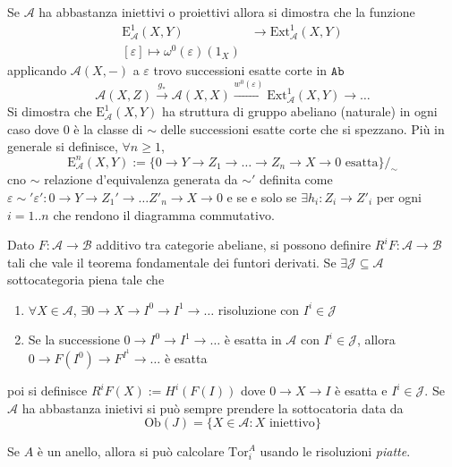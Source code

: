 Se \(\mathcal{A}\) ha abbastanza iniettivi o proiettivi allora si dimostra che
la funzione
\begin{align*}
    \mathrm{E}_\mathcal{A}^{1}{(X, Y)} &\to \mathrm{Ext}_\mathcal{A}^{1}{(X, Y)}
    \\
    [\varepsilon] \longmapsto \omega^{0}{(\varepsilon)}{(1_X)}
\end{align*}
applicando \(\mathcal{A}{(X, -)}\) a \(\varepsilon\) trovo successioni esatte
corte in \(\mathtt{Ab}\) 
\[
  \mathcal{A}{(X, Z)} \overset{g_*}{\to} \mathcal{A}{(X, X)}
  \overset{w^{0}{(\varepsilon)}}{\to} \mathrm{Ext}^{1}_\mathcal{A}{(X, Y)} \to
  \dots
\]
Si dimostra che \(\mathrm{E}^{1}_\mathcal{A}{(X, Y)}\) ha struttura di gruppo
abeliano (naturale) in ogni caso dove 0 è la classe di \(\sim \) delle successioni esatte
corte che si spezzano.
Più in generale si definisce, \(\forall n \ge  1\),
\[
  \mathrm{E}_\mathcal{A}^{n}{(X, Y)} := \{0 \to Y \to Z_{1} \to \dots \to Z_n
  \to X \to 0 \text{ esatta}\}/_\sim 
\]
cno \(\sim \) relazione d'equivalenza generata da \(\sim'\) definita come
\(\varepsilon \sim' \varepsilon' : 0 \to Y \to Z_{1}' \to \dots Z'_n \to X \to
0\) e se e solo se \(\exists h_i : Z_{i} \to Z'_i\) per ogni \(i = 1..n\)  che
rendono il diagramma commutativo.


    Dato \(F : \mathcal{A} \to \mathcal{B}\) additivo tra categorie abeliane, si
    possono definire \(R^{i}F : \mathcal{A} \to \mathcal{B}\) tali che vale il 
    teorema fondamentale dei funtori derivati. Se \(\exists  \mathcal{J}
    \subseteq \mathcal{A} \) sottocategoria piena tale che 
\begin{enumerate}[label = \arabic*)]
    \item \(\forall X \in \mathcal{A}\), \(\exists 0 \to X \to I^{0} \to I^{1}
        \to \dots\) risoluzione con \(I^{i} \in \mathcal{J}\) 
    \item Se la successione \(0 \to I^{0} \to I^{1} \to \dots\) è esatta in \(\mathcal{A}\) con
        \(I^{i} \in \mathcal{J}\), allora \(0 \to F{(I^{0})} \to F^{I^{1}} \to
        \dots\) è esatta
\end{enumerate}
poi si definisce \(R^{i}F{(X)} := H^{i}{(F{(I)})}\) dove \(0 \to X \to I\) è
esatta e \(I^{i} \in \mathcal{J}\). Se \(\mathcal{A}\) ha abbastanza inietivi si
può sempre prendere la sottocatoria data da
\[
  \mathrm{Ob}{(J)} = \{X \in \mathcal{A} : X \text{ iniettivo}\} 
\]

\begin{example}{}
    Se \(A\) è un anello, allora si può calcolare \(\mathrm{Tor}_i^{A}\) usando
    le risoluzioni \emph{piatte}.
\end{example}


